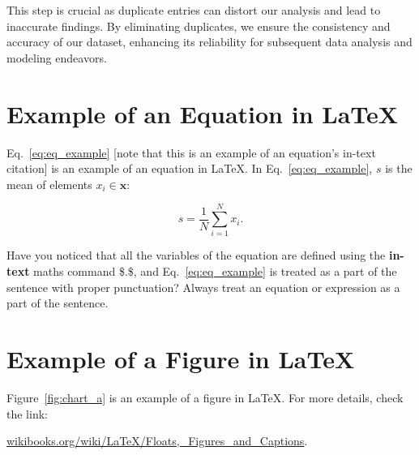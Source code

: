  This step is crucial as duplicate entries can distort our analysis and lead to inaccurate findings. By eliminating duplicates, we ensure the consistency and accuracy of our dataset, enhancing its reliability for subsequent data analysis and modeling endeavors.
\section{Example of an Equation in \LaTeX}
Eq.~\ref{eq:eq_example} [note that this is an example of an equation's in-text citation] is an example of an equation in \LaTeX. In Eq.~\eqref{eq:eq_example}, $ s $ is the mean of elements $ x_i \in \mathbf{x} $: 

\begin{equation}
\label{eq:eq_example} %
s = \frac{1}{N} \sum_{i = 1}^{N} x_i. 
\end{equation}

Have you noticed that all the variables of the equation are defined using the \textbf{in-text} maths command \$.\$, and Eq.~\eqref{eq:eq_example} is treated as a part of the sentence with proper punctuation? Always treat an equation or expression as a part of the sentence. 

\section{Example of a Figure in \LaTeX}
Figure~\ref{fig:chart_a} is an example of a figure in \LaTeX. For more details, check the link:

\href{https://en.wikibooks.org/wiki/LaTeX/Floats,_Figures_and_Captions}{wikibooks.org/wiki/LaTeX/Floats,\_Figures\_and\_Captions}.


